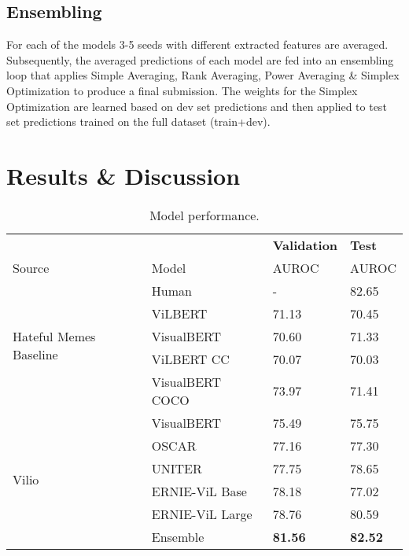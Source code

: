 \documentclass{article}
\begin{document}
\subsection{Ensembling}

For each of the models 3-5 seeds with different extracted features are averaged. Subsequently, the averaged predictions of each model are fed into an ensembling loop that applies Simple Averaging, Rank Averaging, Power Averaging \& Simplex Optimization \cite{wu2005triopt} to produce a final submission. The weights for the Simplex Optimization are learned based on dev set predictions and then applied to test set predictions trained on the full dataset (train+dev). 

\section{Results \& Discussion}

\begin{table}
  \centering
  \begin{tabular}{ p{4cm} p{4cm} p{2cm} p{2cm} } \toprule
&     & \textbf{Validation} & \textbf{Test} \\ [0.5ex] 
    Source & Model & AUROC & AUROC \\ [0.5ex]
    \midrule
    \multirow{5}{8em}{Hateful Memes Baseline} & Human & - & 82.65 \\ 
    \cmidrule(r){2-4}
    & ViLBERT & 71.13 & 70.45 \\
    & VisualBERT & 70.60 & 71.33 \\
    & ViLBERT CC & 70.07 & 70.03 \\
    & VisualBERT COCO & 73.97 & 71.41 \\ [0.5ex] 
    \midrule
    \multirow{6}{8em}{Vilio} & VisualBERT & 75.49 & 75.75 \\ 
    & OSCAR & 77.16 & 77.30 \\
    & UNITER & 77.75 & 78.65 \\
    & ERNIE-ViL Base & 78.18 & 77.02 \\
    & ERNIE-ViL Large & 78.76 & 80.59 \\
    \cmidrule(r){2-4}
    & Ensemble & \textbf{81.56} & \textbf{82.52} \\ [0.5ex]
    \bottomrule
  \end{tabular}
  \newline
  \newline
  \caption{Model performance.}
  \label{tab:table}
\end{table}
\end{document}
